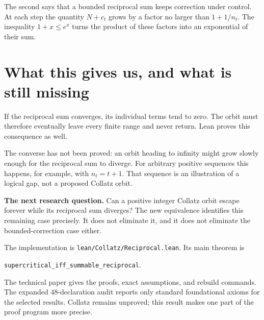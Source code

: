 \documentclass[11pt]{article}
\begin{document}
The second says that a bounded reciprocal sum keeps correction under control. At each step the quantity $N+c_t$ grows by a factor no larger than $1+1/n_t$. The inequality $1+x\le e^x$ turns the product of these factors into an exponential of their sum.

\section{What this gives us, and what is still missing}
If the reciprocal sum converges, its individual terms tend to zero. The orbit must therefore eventually leave every finite range and never return. Lean proves this consequence as well.

The converse has not been proved: an orbit heading to infinity might grow slowly enough for the reciprocal sum to diverge. For arbitrary positive sequences this happens, for example, with $n_t=t+1$. That sequence is an illustration of a logical gap, not a proposed Collatz orbit.

\begin{keyidea}
\textbf{The next research question.} Can a positive integer Collatz orbit escape forever while its reciprocal sum diverges? The new equivalence identifies this remaining case precisely. It does not eliminate it, and it does not eliminate the bounded-correction case either.
\end{keyidea}
The implementation is \texttt{lean/Collatz/Reciprocal.lean}. Its main theorem is
\begin{center}\small\texttt{supercritical\_iff\_summable\_reciprocal}.\end{center}
The technical paper gives the proofs, exact assumptions, and rebuild commands. The expanded 48-declaration audit reports only standard foundational axioms for the selected results. Collatz remains unproved; this result makes one part of the proof program more precise.
\end{document}
